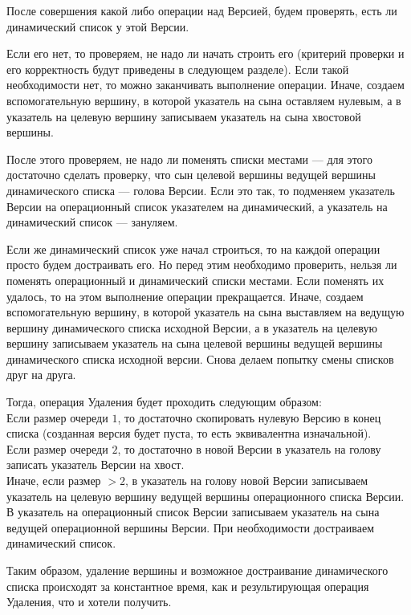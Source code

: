 \documentclass[a4paper,12pt]{extarticle}
\begin{document}
После совершения какой либо операции над Версией, будем проверять, есть ли динамический список у этой Версии.\par
Если его нет, то проверяем, не надо ли начать строить его (критерий проверки и его корректность будут приведены в следующем разделе). Если такой необходимости нет, то можно заканчивать выполнение операции. Иначе, создаем вспомогательную вершину, в которой указатель на сына оставляем нулевым, а в указатель на целевую вершину записываем указатель на сына хвостовой вершины.\par
После этого проверяем, не надо ли поменять списки местами — для этого достаточно сделать проверку, что сын целевой вершины ведущей вершины динамического списка — голова Версии. Если это так, то подменяем указатель Версии на операционный список указателем на динамический, а указатель на динамический список — зануляем.\par
Если же динамический список уже начал строиться, то на каждой операции просто будем достраивать его. Но перед этим необходимо проверить, нельзя ли поменять операционный и динамический списки местами. Если поменять их удалось, то на этом выполнение операции прекращается. Иначе, создаем вспомогательную вершину, в которой указатель на сына выставляем на ведущую вершину динамического списка исходной Версии, а в указатель на целевую вершину записываем указатель на сына целевой вершины ведущей вершины динамического списка исходной версии. Снова делаем попытку смены списков друг на друга.\par
Тогда, операция Удаления будет проходить следующим образом:\\
Если размер очереди $1$, то достаточно скопировать нулевую Версию в конец списка (созданная версия будет пуста, то есть эквивалентна изначальной).\\
Если размер очереди $2$, то достаточно в новой Версии в указатель на голову записать указатель Версии на хвост.\\
Иначе, если размер $> 2$, в указатель на голову новой Версии записываем указатель на целевую вершину ведущей вершины операционного списка Версии. В указатель на операционный список Версии записываем указатель на сына ведущей операционной вершины Версии. При необходимости достраиваем динамический список.\par
Таким образом, удаление вершины и возможное достраивание динамического списка происходят за константное время, как и результирующая операция Удаления, что и хотели получить.
\end{document}
